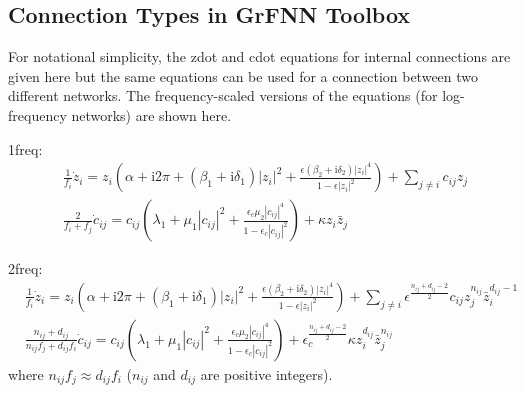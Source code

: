 \documentclass{report}
\begin{document}
\subsection*{Connection Types in GrFNN Toolbox}

For notational simplicity, the zdot and cdot equations for internal connections are given here but the same equations can be used for a connection between two different networks. The frequency-scaled versions of the equations (for log-frequency networks) are shown here.
 
\bigskip
\noindent 1freq:
\begin{equation*}
\begin{split}
&\frac{1}{f_i}\dot{z}_i = z_i\left(\alpha + \textrm{i}2\pi + \left(\beta_1 + \textrm{i} \delta_1\right)|z_i|^2
+ \frac{\epsilon\left(\beta_2 + \textrm{i} \delta_2\right)|z_i|^4}{1-\epsilon |z_i|^2}\right)
+ \displaystyle\sum_{j \neq i} c_{ij}z_j\\
&\frac{2}{f_i + f_j}\dot{c}_{ij} = c_{ij}\left(\lambda_1 + \mu_1 |c_{ij}|^2
+ \frac{\epsilon_c\mu_2 |c_{ij}|^4}{1-\epsilon_c |c_{ij}|^2}\right) + \kappa z_i\bar{z}_j
\end{split}
\end{equation*}

\bigskip \bigskip
\noindent 2freq:
\begin{equation*}
\begin{split}
&\frac{1}{f_i}\dot{z}_i = z_i\left(\alpha + \textrm{i}2\pi + \left(\beta_1 + \textrm{i} \delta_1\right)|z_i|^2
+ \frac{\epsilon\left(\beta_2 + \textrm{i} \delta_2\right)|z_i|^4}{1-\epsilon |z_i|^2}\right)
+ \displaystyle\sum_{j \neq i}\epsilon^\frac{n_{ij}+d_{ij}-2}{2} c_{ij}z_j^{n_{ij}}\bar{z}_i^{d_{ij}-1}\\
&\frac{n_{ij}+d_{ij}}{n_{ij}f_j+d_{ij}f_i}\dot{c}_{ij} = c_{ij}\left(\lambda_1 + \mu_1 |c_{ij}|^2
+ \frac{\epsilon_c\mu_2 |c_{ij}|^4}{1-\epsilon_c |c_{ij}|^2}\right)
+ \epsilon_c^\frac{n_{ij}+d_{ij}-2}{2}\kappa z_i^{d_{ij}}\bar{z}_j^{n_{ij}}
\end{split}
\end{equation*}
where $n_{ij} f_j \approx d_{ij} f_i$ ($n_{ij}$ and $d_{ij}$ are positive integers).
\end{document}
